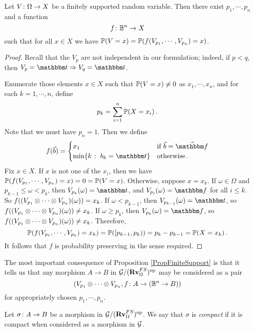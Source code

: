\documentclass{report}[11pt]
\begin{document}
\begin{proposition}
  Let $V\colon \Omega \to X$ be a finitely supported random variable.  
  Then there exist $p_1,\cdots,p_n$ and a function
  \[
    f \colon \mathbb{B}^n \to X
    \]
  such that for all $x\in X$ we have $\mathbb{P}(V = x) = \mathbb{P}(f(V_{p_1},\cdots,V_{p_n}) = x)$.
  \label{PropFiniteSupport}
\end{proposition}
\begin{proof}
  Recall that the $V_p$ are not independent in our formulation; indeed, if $p<q$, then $V_p = \true \Rightarrow V_q = \true$.

  Enumerate those elements $x\in X$ such that $\mathbb{P}(V = x) \ne 0$ as $x_1,\cdots,x_n$, and for each $k = 1,\cdots,n$, define
  \[
    p_k = \sum_{i=1}^n \mathbb{P}(X = x_i)\,.
    \]
  Note that we must have $p_n = 1$.  
  Then we define
  \[
    f(\vec{b}) = \begin{cases}
      x_1 & \text{if $\vec{b} = \vec{\false}$} \\
      \min\{k \suchthat b_k = \true\} & \text{otherwise}\,.
    \end{cases}
    \]
  Fix $x\in X$.  
  If $x$ is not one of the $x_i$, then we have $\mathbb{P}(f(V_{p_1},\cdots,V_{p_n}) = x) = 0 = \mathbb{P}(V = x)$.  
  Otherwise, suppose $x = x_k$.  
  If $\omega\in\Omega$ and $p_{k-1}\le\omega<p_k$, then $V_{p_k}(\omega) = \true$, and $V_{p_i}(\omega) = \false$ for all $i \le k$.  
  So $f((V_{p_1}\otimes\cdots\otimes V_{p_n})(\omega)) = x_k$.
  If $\omega<p_{k-1}$, then $V_{p_{k-1}}(\omega) = \true$, so $f((V_{p_1}\otimes\cdots\otimes V_{p_n})(\omega)) \ne x_k$.
  If $\omega\ge p_k$, then $V_{p_k}(\omega) = \false$, so $f((V_{p_1}\otimes\cdots\otimes V_{p_n})(\omega)) \ne x_k$.  
  Therefore, 
  \[
    \mathbb{P}(f(V_{p_1},\cdots,V_{p_k}) = x_k) = \mathbb{P}([p_{k-1},p_k)) = p_k - p_{k-1} = \mathbb{P}(X = x_k)\,.
    \]
  It follows that $f$ is probability preserving in the sense required.
\end{proof}

The most important consequence of Proposition \ref{PropFiniteSupport} is that it tells us that any morphism $A\to B$ in $\mathcal G/({\normalfont\textbf{Rv}}_{\Omega}^{FS})^{\mathrm{op}}$ may be considered as a pair 
\[
  (V_{p_1}\otimes\cdots\otimes V_{p_n},f \colon A \to (\mathbb{B}^n \to B))
  \]
for appropriately chosen $p_1,\cdots,p_n$.

\begin{definition}
  Let $\sigma\colon A \to B$ be a morphism in $\mathcal G/({\normalfont\textbf{Rv}}_{\Omega}^{FS})^{\mathrm{op}}$.  
  We say that $\sigma$ is \emph{compact} if it is compact when considered as a morphism in $\mathcal G$.
\end{definition}
\end{document}
